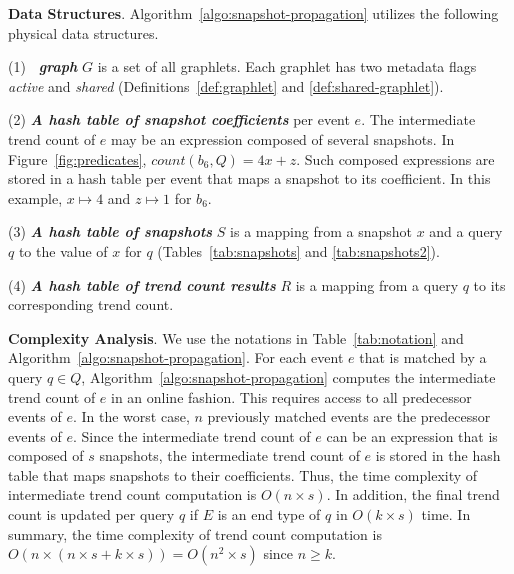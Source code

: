 \textbf{Data Structures}.
%
Algorithm~\ref{algo:snapshot-propagation} utilizes the following physical data structures.

(1) \textbf{\textit{\app\ graph}} $G$ is a set of all graphlets. Each graphlet has two metadata flags \textit{active} and \textit{shared} (Definitions~\ref{def:graphlet} and \ref{def:shared-graphlet}). 

(2) \textbf{\textit{A hash table of snapshot coefficients}} per event $e$. The intermediate trend count of $e$ may be an expression composed of several snapshots. 
In Figure~\ref{fig:predicates}, $count(b_6,Q) = 4x + z$. 
Such composed expressions are stored in a hash table per event that maps a snapshot to its coefficient. In this example, $x \mapsto 4$ and $z \mapsto 1$ for $b_6$.

(3) \textbf{\textit{A hash table of snapshots}} $S$ is a mapping from a snapshot $x$ and a query $q$ to the value of $x$ for $q$ (Tables~\ref{tab:snapshots} and \ref{tab:snapshots2}). 

(4) \textbf{\textit{A hash table of trend count results}} $R$ is a mapping from a query $q$ to its corresponding trend count.



\textbf{Complexity Analysis}.
%
We use the notations in Table~\ref{tab:notation} and Algorithm~\ref{algo:snapshot-propagation}.  
%
For each event $e$ that is matched by a query $q \in Q$, Algorithm~\ref{algo:snapshot-propagation} computes the intermediate trend count of $e$ in an online fashion. This requires access to all predecessor events of $e$. In the worst case, $n$ previously matched events are the predecessor events of $e$. Since the intermediate trend count of $e$ can be an expression that is composed of $s$ snapshots, the intermediate trend count of $e$ is stored in the hash table that maps snapshots to their coefficients. Thus, the time complexity of intermediate trend count computation is $O(n \times s)$. In addition, the final trend count is updated per query $q$ if $E$ is an end type of $q$ in $O(k \times s)$ time. In summary, the time complexity of trend count computation is $O(n \times (n \times s + k \times s)) = O(n^2 \times s)$ since $n \geq k$.


